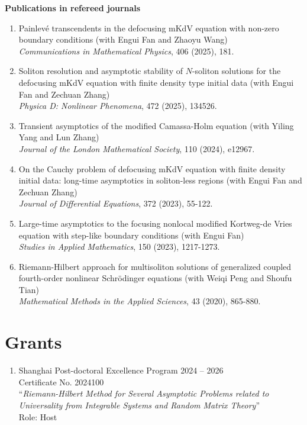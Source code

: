 \documentclass[margin]{res}
\begin{document}
\begin{resume}
\textbf{Publications in refereed journals}
\begin{enumerate}[1.]
    \item Painlev\'{e} transcendents in the defocusing mKdV equation with non-zero boundary conditions (with Engui Fan and Zhaoyu Wang)\\
    {\sl Communications in Mathematical Physics}, 406 (2025), 181.

    \item Soliton resolution and asymptotic stability of $N$-soliton solutions for the defocusing mKdV equation with finite density type initial data (with Engui Fan and Zechuan Zhang)\\ 
    {\sl Physica D: Nonlinear Phenomena}, 472 (2025), 134526. 

    \item Transient asymptotics of the modified Camassa-Holm equation (with Yiling Yang and Lun Zhang) \\
    {\sl Journal of the London Mathematical Society}, 110 (2024), e12967. 

    \item On the Cauchy problem of defocusing mKdV equation with finite density initial data: long-time asymptotics in soliton-less regions (with Engui Fan and Zechuan Zhang)\\
    {\sl Journal of Differential Equations}, 372 (2023), 55-122.

    \item Large-time asymptotics to the focusing nonlocal modified Kortweg-de Vries equation with step-like boundary conditions (with Engui Fan)\\
    {\sl Studies in Applied Mathematics}, 150 (2023), 1217-1273. 
    
    \item Riemann-Hilbert approach for multisoliton solutions of generalized coupled fourth-order nonlinear Schr\"odinger equations
    (with Weiqi Peng and Shoufu Tian)\\
    {\sl Mathematical Methods in the Applied Sciences}, 43 (2020), 865-880.
\end{enumerate}

\section{Grants}
\begin{enumerate}[--]
\item Shanghai Post-doctoral Excellence Program \hfill 2024 -- 2026  \\
Certificate No. 2024100\\
``{\sl Riemann-Hilbert Method for Several Asymptotic Problems related to Universality from Integrable Systems and Random Matrix Theory}''  \\
Role: Host


\end{enumerate}
\end{resume}
\end{document}
